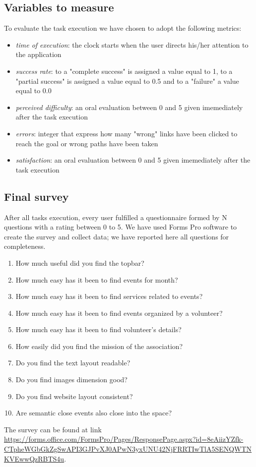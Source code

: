 \subsection{Variables to measure}
To evaluate the task execution we have chosen to adopt the following metrics:
\begin{itemize}
	\item \emph{time of execution}: the clock starts when the user directs his/her attention to the application
	\item \emph{success rate}: to a "complete success" is assigned a value equal to 1, to a "partial success" is assigned a value 		equal to 0.5 and to a "failure" a value equal to 0.0
	\item \emph{perceived difficulty}: an oral evaluation between 0 and 5 given imemediately after the task execution
	\item \emph{errors}: integer that express how many "wrong" links have been clicked to reach the goal or wrong paths have 		been taken
	\item \emph{satisfaction}: an oral evaluation between 0 and 5 given imemediately after the task execution
\end{itemize}

\subsection{Final survey}
After all tasks execution, every user fulfilled a questionnaire formed by N questions with a rating between 0 to 5. We have used Forms Pro software to create the survey and collect data; we have reported here all questions for completeness.
\begin{enumerate}
	\item How much useful did you find the topbar? 
	\item How much easy has it been to find events for month?
	\item How much easy has it been to find services related to events?
	\item How much easy has it been to find events organized by a volunteer?
	\item How much easy has it been to find volunteer's details?
	\item How easily did you find the mission of the association?
	\item Do you find the text layout readable?
	\item Do you find images dimension good?
	\item Do you find website layout consistent?
	\item Are semantic close events also close into the space?
\end{enumerate}
The survey can be found at link \\ \url{https://forms.office.com/FormsPro/Pages/ResponsePage.aspx?id=8eAiizYZfk-CTpheWGbGkZgSwAPI3GJPvXJ0APwN3yxUNU42NjFRRTIwTlA5SENQWTNKVEwwQzRBTS4u}.
